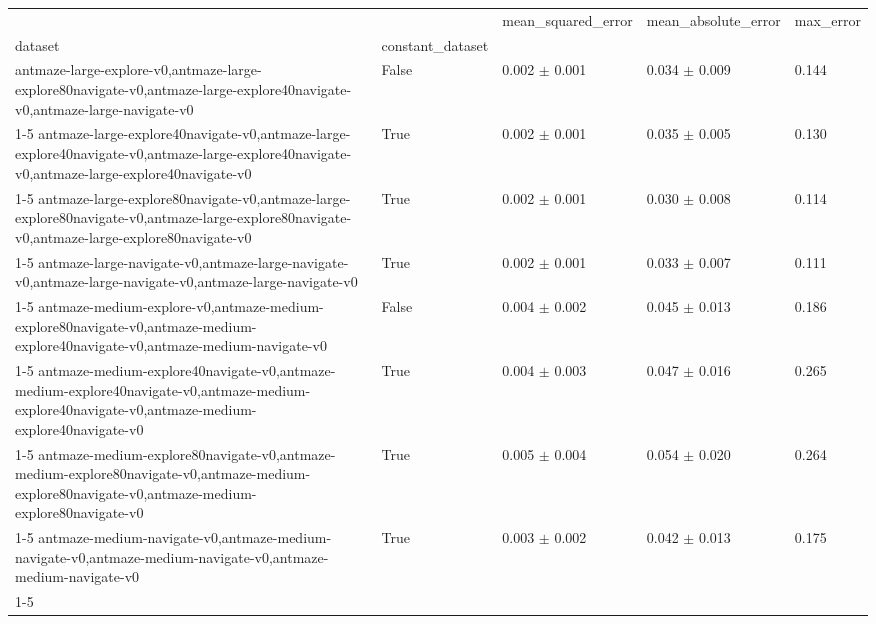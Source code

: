 \begin{tabular}{lllll}
\toprule
 &  & mean_squared_error & mean_absolute_error & max_error \\
dataset & constant_dataset &  &  &  \\
\midrule
antmaze-large-explore-v0,antmaze-large-explore80navigate-v0,antmaze-large-explore40navigate-v0,antmaze-large-navigate-v0 & False & 0.002 $\pm$ 0.001 & 0.034 $\pm$ 0.009 & 0.144 \\
\cline{1-5}
antmaze-large-explore40navigate-v0,antmaze-large-explore40navigate-v0,antmaze-large-explore40navigate-v0,antmaze-large-explore40navigate-v0 & True & 0.002 $\pm$ 0.001 & 0.035 $\pm$ 0.005 & 0.130 \\
\cline{1-5}
antmaze-large-explore80navigate-v0,antmaze-large-explore80navigate-v0,antmaze-large-explore80navigate-v0,antmaze-large-explore80navigate-v0 & True & 0.002 $\pm$ 0.001 & 0.030 $\pm$ 0.008 & 0.114 \\
\cline{1-5}
antmaze-large-navigate-v0,antmaze-large-navigate-v0,antmaze-large-navigate-v0,antmaze-large-navigate-v0 & True & 0.002 $\pm$ 0.001 & 0.033 $\pm$ 0.007 & 0.111 \\
\cline{1-5}
antmaze-medium-explore-v0,antmaze-medium-explore80navigate-v0,antmaze-medium-explore40navigate-v0,antmaze-medium-navigate-v0 & False & 0.004 $\pm$ 0.002 & 0.045 $\pm$ 0.013 & 0.186 \\
\cline{1-5}
antmaze-medium-explore40navigate-v0,antmaze-medium-explore40navigate-v0,antmaze-medium-explore40navigate-v0,antmaze-medium-explore40navigate-v0 & True & 0.004 $\pm$ 0.003 & 0.047 $\pm$ 0.016 & 0.265 \\
\cline{1-5}
antmaze-medium-explore80navigate-v0,antmaze-medium-explore80navigate-v0,antmaze-medium-explore80navigate-v0,antmaze-medium-explore80navigate-v0 & True & 0.005 $\pm$ 0.004 & 0.054 $\pm$ 0.020 & 0.264 \\
\cline{1-5}
antmaze-medium-navigate-v0,antmaze-medium-navigate-v0,antmaze-medium-navigate-v0,antmaze-medium-navigate-v0 & True & 0.003 $\pm$ 0.002 & 0.042 $\pm$ 0.013 & 0.175 \\
\cline{1-5}
\bottomrule
\end{tabular}
